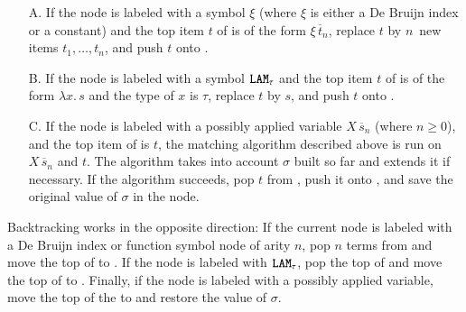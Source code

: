 \begin{enumerate}
\item[A.] If the node is labeled with a symbol $\xi$ (where
  $\xi$ is either a De Bruijn index or a constant) and the top item $t$
  of \tstack{} is of the form $\xi \, \overline{t}_n$, replace $t$ by
  $n$~new items $t_1,\dots,t_n$, and push $t$ onto \tproc{}.
\smallskip
\item[B.] If the node is labeled with a symbol $\texttt{LAM}_\tau$ and the top
  item $t$ of \tstack{} is of the form $\lambda x.\, s$ and the type of $x$ is
  $\tau$, replace $t$ by $s$, and push $t$ onto \tproc{}.
\smallskip
\item[C.] If the node is labeled with a possibly applied variable $X \, \overline{s}_n$
  (where $n \geq 0$), and the top item of \tstack{} is $t$, the 
  matching algorithm described above is run on $X \, \overline{s}_n$ and $t$.
  The algorithm takes into account $\sigma$ built so far and extends it
  if necessary. If the algorithm succeeds, pop $t$ from \tstack{}, push it onto \tproc{},
  and save the original value of $\sigma$ in the node.
\end{enumerate}
  
Backtracking works in the opposite direction: If the current node is labeled with a De
Bruijn index or function symbol node of arity $n$, pop $n$ terms from \tstack{} and move the
top of \tproc{} to \tstack{}. If the node is labeled with
$\texttt{LAM}_\tau$, pop the top of \tstack{} and move the top of \tproc{} to
\tstack{}. Finally, if the node is labeled with a possibly applied variable, move the top of the
\tproc{} to \tstack{} and restore the value of $\sigma$.


